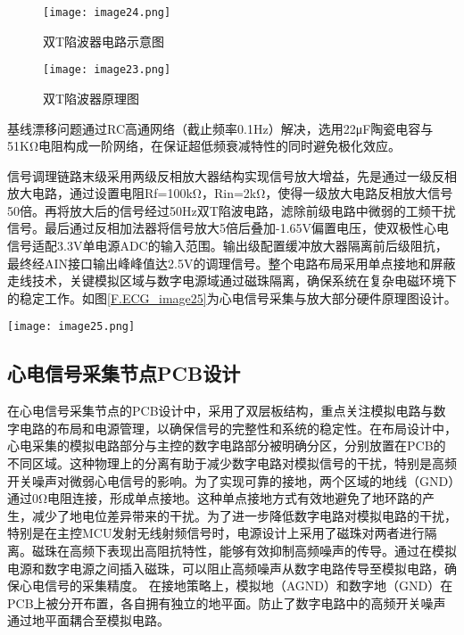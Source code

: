 \begin{figure}[hbt]
    \centering
    \texttt{[image: image24.png]}
    \caption{双T陷波器电路示意图}
    \label{F.ECG_image24}
\end{figure}

\begin{figure}[hbt]
    \centering
    \texttt{[image: image23.png]}
    \caption{双T陷波器原理图}
    \label{F.ECG_image23}
\end{figure}

基线漂移问题通过RC高通网络（截止频率0.1Hz）解决，选用22μF陶瓷电容与51KΩ电阻构成一阶网络，在保证超低频衰减特性的同时避免极化效应。

信号调理链路末级采用两级反相放大器结构实现信号放大增益，先是通过一级反相放大电路，通过设置电阻Rf=100kΩ，Rin=2kΩ，使得一级放大电路反相放大信号50倍。再将放大后的信号经过50Hz双T陷波电路，滤除前级电路中微弱的工频干扰信号。最后通过反相加法器将信号放大5倍后叠加-1.65V偏置电压，使双极性心电信号适配3.3V单电源ADC的输入范围。输出级配置缓冲放大器隔离前后级阻抗，最终经AIN接口输出峰峰值达2.5V的调理信号。整个电路布局采用单点接地和屏蔽走线技术，关键模拟区域与数字电源域通过磁珠隔离，确保系统在复杂电磁环境下的稳定工作。如图\ref{F.ECG_image25}为心电信号采集与放大部分硬件原理图设计。

\begin{sidewaysfigure}
    \centering
    \texttt{[image: image25.png]}
    \caption{心电信号采集与放大部分硬件原理图设计}
    \label{F.ECG_image25}
\end{sidewaysfigure}

\newpage

\subsection{心电信号采集节点PCB设计}

在心电信号采集节点的PCB设计中，采用了双层板结构，重点关注模拟电路与数字电路的布局和电源管理，以确保信号的完整性和系统的稳定性。在布局设计中，心电采集的模拟电路部分与主控的数字电路部分被明确分区，分别放置在PCB的不同区域。这种物理上的分离有助于减少数字电路对模拟信号的干扰，特别是高频开关噪声对微弱心电信号的影响。为了实现可靠的接地，两个区域的地线（GND）通过0Ω电阻连接，形成单点接地。这种单点接地方式有效地避免了地环路的产生，减少了地电位差异带来的干扰。为了进一步降低数字电路对模拟电路的干扰，特别是在主控MCU发射无线射频信号时，电源设计上采用了磁珠对两者进行隔离。磁珠在高频下表现出高阻抗特性，能够有效抑制高频噪声的传导。通过在模拟电源和数字电源之间插入磁珠，可以阻止高频噪声从数字电路传导至模拟电路，确保心电信号的采集精度。
在接地策略上，模拟地（AGND）和数字地（GND）在PCB上被分开布置，各自拥有独立的地平面。防止了数字电路中的高频开关噪声通过地平面耦合至模拟电路。

